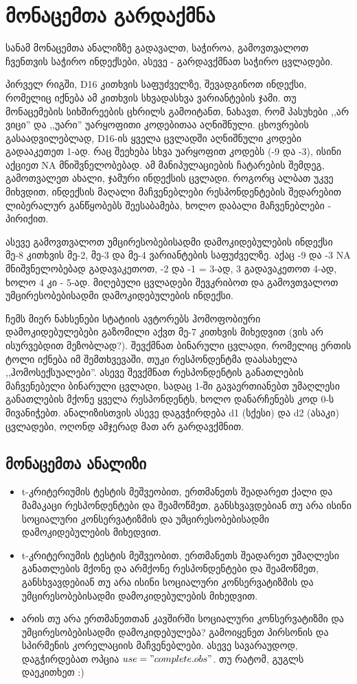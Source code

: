 \documentclass{article}\usepackage[]{graphicx}\usepackage[]{color}
\begin{document}
\section*{მონაცემთა გარდაქმნა}

სანამ მონაცემთა ანალიზზე გადავალთ, საჭიროა, გამოვთვალოთ ჩვენთვის საჭირო ინდექსები, ასევე - გარდავქმნათ საჭირო ცვლადები.

პირველ რიგში, D16 კითხვის საფუძველზე, შევადგინოთ ინდექსი, რომელიც იქნება ამ კითხვის სხვადასხვა ვარიანტების ჯამი. თუ მონაცემების სიხშირეების ცხრილს გამოიტანთ, ნახავთ, რომ პასუხები ,,არ ვიცი'' და ,,უარი'' უარყოფითი კოდებითაა აღნიშნული. ცხოვრების გასაადვილებლად, D16-ის ყველა ცვლადში აღნიშნული კოდები გადააკეთეთ 1-ად. რაც შეეხება სხვა უარყოფით კოდებს (-9 და -3), ისინი აქციეთ NA მნიშვნელობებად. ამ მანიპულაციების ჩატარების შემდეგ, გამოთვალეთ ახალი, ჯამური ინდექსის ცვლადი. როგორც ალბათ უკვე მიხვდით, ინდექსის მაღალი მაჩვენებლები რესპონდენტების შედარებით ლიბერალურ განწყობებს შეესაბამება, ხოლო დაბალი მაჩვენებლები - პირიქით.

ასევე გამოვთვალოთ უმცირესობებისადმი დამოკიდებულების ინდექსი მე-8 კითხვის მე-2, მე-3 და მე-4 ვარიანტების საფუძველზე. აქაც -9 და -3 NA მნიშვნელობებად გადავაკეთოთ, -2 და -1 = 3-ად, 3 გადავაკეთოთ 4-ად, ხოლო 4 კი - 5-ად. მიღებული ცვლადები შევკრიბოთ და გამოვთვალოთ უმცირესობებისადმი დამოკიდებულების ინდექსი.

ჩემს მიერ ნახსენები სტატიის ავტორებს ჰომოფობიური დამოკიდებულებები გაზომილი აქვთ მე-7 კითხვის მიხედვით (ვის არ ისურვებდით მეზობლად?). შევქმნათ ბინარული ცვლადი, რომელიც ერთის ტოლი იქნება იმ შემთხვევაში, თუკი რესპონდენტმა დაასახელა ,,ჰომოსექსუალები''. ასევე შევქმნათ რესპონდენტის განათლების მაჩვენებელი ბინარული ცვლადი, სადაც 1-ში გავაერთიანებთ უმაღლესი განათლების მქონე ყველა რესპონდენტს, ხოლო დანარჩენებს კოდ 0-ს მივანიჭებთ. ანალიზისთვის ასევე დაგვჭირდება d1 (სქესი) და d2 (ასაკი) ცვლადები, ოღონდ ამჯერად მათ არ გარდავქმნით.

\subsection*{მონაცემთა ანალიზი}

\begin{itemize}
\item{t-კრიტერიუმის ტესტის მეშვეობით, ერთმანეთს შეადარეთ ქალი და მამაკაცი რესპონდენტები და შეამოწმეთ, განსხვავდებიან თუ არა ისინი სოციალური კონსერვატიზმის და უმცირესობებისადმი დამოკიდებულების მიხედვით.}
\item{t-კრიტერიუმის ტესტის მეშვეობით, ერთმანეთს შეადარეთ უმაღლესი განათლების მქონე და არმქონე რესპონდენტები და შეამოწმეთ, განსხვავდებიან თუ არა ისინი სოციალური კონსერვატიზმის და უმცირესობებისადმი დამოკიდებულების მიხედვით.}
\item{არის თუ არა ერთმანეთთან კავშირში სოციალური კონსერვატიზმი და უმცირესობებისადმი დამოკიდებულება? გამოიყენეთ პირსონის და სპირმენის კორელაციის მაჩვენებლები. ასევე სავარაუდოდ, დაგჭირდებათ ოპცია $use="complete.obs"$. თუ რატომ, გუგლს დაეკითხეთ :)}
\end{itemize}
\end{document}
